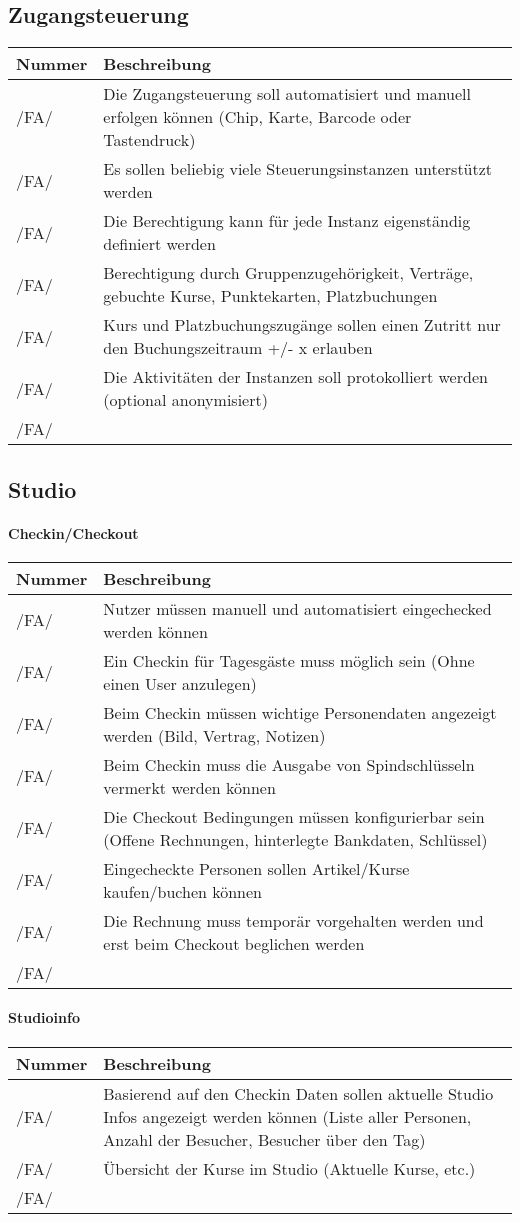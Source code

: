 \documentclass[a4paper,12pt]{article}
\newcommand\addrow[2]{#1 &#2\\ }
\newcommand\addheading[2]{#1 &#2\\ \hline}
\newcommand\tabularhead{\begin{tabular}{lp{13cm}}
\hline
}
\newenvironment{usecase}{\tabularhead}
{\hline\end{tabular}}
\begin{document}
\subsection{Zugangsteuerung}
\begin{usecase}
  \addheading{Nummer}{Beschreibung} 
  \addrow{/FA/}{Die Zugangsteuerung soll automatisiert und manuell erfolgen können (Chip, Karte, Barcode oder Tastendruck)}
  \addrow{/FA/}{Es sollen beliebig viele Steuerungsinstanzen unterstützt werden}
  \addrow{/FA/}{Die Berechtigung kann für jede Instanz eigenständig definiert werden}
  \addrow{/FA/}{Berechtigung durch Gruppenzugehörigkeit, Verträge, gebuchte Kurse, Punktekarten, Platzbuchungen}
  \addrow{/FA/}{Kurs und Platzbuchungszugänge sollen einen Zutritt nur den Buchungszeitraum +/- x erlauben}
  \addrow{/FA/}{Die Aktivitäten der Instanzen soll protokolliert werden (optional anonymisiert)}
  \addrow{/FA/}{}
\end{usecase}


\subsection{Studio}
\paragraph{\textbf{Checkin/Checkout}\\}
\begin{usecase}
  \addheading{Nummer}{Beschreibung} 
  \addrow{/FA/}{Nutzer müssen manuell und automatisiert eingechecked werden können}
  \addrow{/FA/}{Ein Checkin für Tagesgäste muss möglich sein (Ohne einen User anzulegen)}
  \addrow{/FA/}{Beim Checkin müssen wichtige Personendaten angezeigt werden (Bild, Vertrag, Notizen)}
  \addrow{/FA/}{Beim Checkin muss die Ausgabe von Spindschlüsseln vermerkt werden können}
  \addrow{/FA/}{Die Checkout Bedingungen müssen konfigurierbar sein (Offene Rechnungen, hinterlegte Bankdaten, Schlüssel)}
  \addrow{/FA/}{Eingecheckte Personen sollen Artikel/Kurse kaufen/buchen können}
  \addrow{/FA/}{Die Rechnung muss temporär vorgehalten werden und erst beim Checkout beglichen werden}
  \addrow{/FA/}{}
\end{usecase}

\paragraph{\textbf{Studioinfo}\\}
\begin{usecase}
  \addheading{Nummer}{Beschreibung} 
  \addrow{/FA/}{Basierend auf den Checkin Daten sollen aktuelle Studio Infos angezeigt werden können (Liste aller Personen, Anzahl der Besucher, Besucher über den Tag)}
  \addrow{/FA/}{Übersicht der Kurse im Studio (Aktuelle Kurse, etc.)}
  \addrow{/FA/}{}
\end{usecase}
\end{document}
